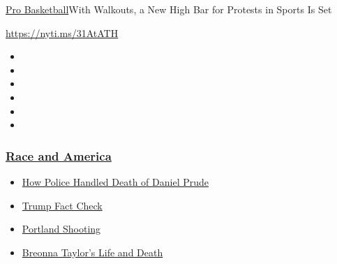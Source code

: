 \href{/section/sports/basketball}{Pro Basketball}\textbar{}With
Walkouts, a New High Bar for Protests in Sports Is Set

\url{https://nyti.ms/31AtATH}

\begin{itemize}
\item
\item
\item
\item
\item
\item
\end{itemize}

\hypertarget{race-and-america}{%
\subsubsection{\texorpdfstring{\href{https://www.nytimes3xbfgragh.onion/news-event/george-floyd-protests-minneapolis-new-york-los-angeles?name=styln-george-floyd\&region=TOP_BANNER\&block=storyline_menu_recirc\&action=click\&pgtype=Article\&impression_id=73314a90-f1bb-11ea-a1b0-a5a6897b98d6\&variant=undefined}{Race
and America}}{Race and America}}\label{race-and-america}}

\begin{itemize}
\tightlist
\item
  \href{https://www.nytimes3xbfgragh.onion/2020/09/04/nyregion/rochester-police-daniel-prude.html?name=styln-george-floyd\&region=TOP_BANNER\&block=storyline_menu_recirc\&action=click\&pgtype=Article\&impression_id=73314a91-f1bb-11ea-a1b0-a5a6897b98d6\&variant=undefined}{How
  Police Handled Death of Daniel Prude}
\item
  \href{https://www.nytimes3xbfgragh.onion/2020/09/01/us/politics/trump-fact-check-protests.html?name=styln-george-floyd\&region=TOP_BANNER\&block=storyline_menu_recirc\&action=click\&pgtype=Article\&impression_id=73314a92-f1bb-11ea-a1b0-a5a6897b98d6\&variant=undefined}{Trump
  Fact Check}
\item
  \href{https://www.nytimes3xbfgragh.onion/2020/08/30/us/portland-shooting-explained.html?name=styln-george-floyd\&region=TOP_BANNER\&block=storyline_menu_recirc\&action=click\&pgtype=Article\&impression_id=733171a0-f1bb-11ea-a1b0-a5a6897b98d6\&variant=undefined}{Portland
  Shooting}
\item
  \href{https://www.nytimes3xbfgragh.onion/2020/08/30/us/breonna-taylor-police-killing.html?name=styln-george-floyd\&region=TOP_BANNER\&block=storyline_menu_recirc\&action=click\&pgtype=Article\&impression_id=733171a1-f1bb-11ea-a1b0-a5a6897b98d6\&variant=undefined}{Breonna
  Taylor's Life and Death}
\end{itemize}

